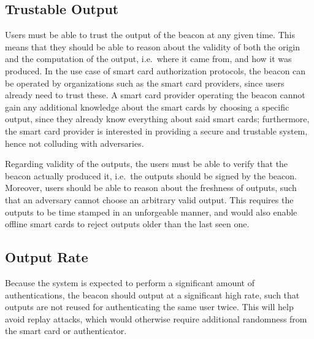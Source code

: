 \subsection{Trustable Output}
\label{sub:trustable_output}
Users must be able to trust the output of the beacon at any given time.
This means that they should be able to reason about the validity of both the origin and the computation of the output, i.e.\ where it came from, and how it was produced.
In the use case of smart card authorization protocols, the beacon can be operated by organizations such as the smart card providers, since users already need to trust these.
A smart card provider operating the beacon cannot gain any additional knowledge about the smart cards by choosing a specific output, since they already know everything about said smart cards; furthermore, the smart card provider is interested in providing a secure and trustable system, hence not colluding with adversaries.

Regarding validity of the outputs, the users must be able to verify that the beacon actually produced it, i.e.\ the outputs should be signed by the beacon.
Moreover, users should be able to reason about the freshness of outputs, such that an adversary cannot choose an arbitrary valid output.
This requires the outputs to be time stamped in an unforgeable manner, and would also enable offline smart cards to reject outputs older than the last seen one.

\subsection{Output Rate}
\label{sub:output_rate}
Because the system is expected to perform a significant amount of authentications, the beacon should output at a significant high rate, such that outputs are not reused for authenticating the same user twice.
This will help avoid replay attacks, which would otherwise require additional randomness from the smart card or authenticator.



